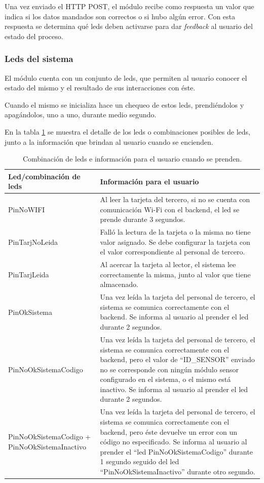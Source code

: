 Una vez enviado el HTTP POST, el módulo recibe como respuesta un valor que indica si los datos mandados son correctos o si hubo algún error. Con esta respuesta se determina qué leds deben activarse para dar \textit{feedback} al usuario del estado del proceso.

\subsubsection{Leds del sistema}

El módulo cuenta con un conjunto de leds, que permiten al usuario conocer el estado del mismo y el resultado de sus interacciones con éste.

Cuando el mismo se inicializa hace un chequeo de estos leds, prendiéndolos y apagándolos, uno a uno, durante medio segundo.

En la tabla \ref{tab:combinacionLedsSensor} se muestra el detalle de los leds o combinaciones posibles de leds, junto a la información que brindan al usuario cuando se encienden.

\begin{table}[h]
	\centering
	\caption[Leds módulo sensor ]{Combinación de leds e información para el usuario cuando se prenden.}
	\begin{tabular}{p{4cm} p{8.5cm} } 	

		\toprule
		\textbf{Led/combinación de leds} & 
		\textbf{Información para el usuario}
		\\
		\midrule

PinNoWIFI & Al leer la tarjeta del tercero, si no se cuenta con comunicación Wi-Fi con el backend, el led se prende durante 3 segundos.\\ 
PinTarjNoLeida & Falló la lectura de la tarjeta o la misma no tiene valor asignado. Se debe configurar la tarjeta con el valor correspondiente al personal de tercero.\\
PinTarjLeida & Al acercar la tarjeta al lector, el sistema lee correctamente la misma, junto al valor que tiene almacenado.\\
PinOkSistema & Una vez leída la tarjeta del personal de tercero, el sistema se comunica correctamente con el backend. Se informa al usuario al prender el led durante 2 segundos. \\
PinNoOkSistemaCodigo & Una vez leída la tarjeta del personal de tercero, el sistema se comunica correctamente con el backend, pero el valor de ``ID\_SENSOR'' enviado no se corresponde con ningún módulo sensor configurado en el sistema, o el mismo está inactivo. Se informa al usuario al prender el led durante 2 segundos. \\
PinNoOkSistemaCodigo
+
PinNoOkSistemaInactivo & Una vez leída la tarjeta del personal de tercero, el sistema se comunica correctamente con el backend, pero éste devuelve un error con un código no especificado. Se informa al usuario al prender el ``led PinNoOkSistemaCodigo'' durante 1 segundo seguido del led ``PinNoOkSistemaInactivo'' durante otro segundo.
\\
		\bottomrule
		\hline
	\end{tabular}
	\label{tab:combinacionLedsSensor}
\end{table}


